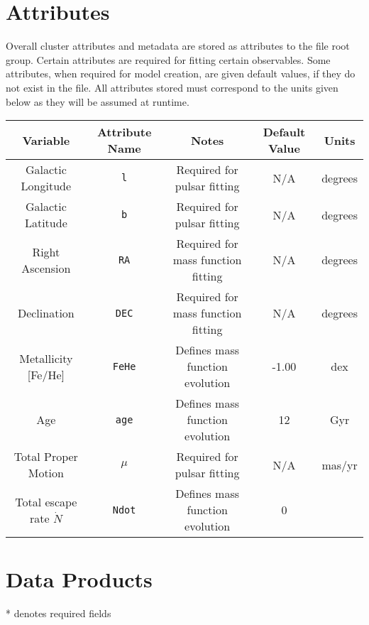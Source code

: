 \documentclass[12pt]{article}
\begin{document}
\section{Attributes}

Overall cluster attributes and metadata are stored as attributes to the
file root group. Certain attributes are required for fitting certain
observables. Some attributes, when required for model creation, are given
default values, if they do not exist in the file. All attributes stored must
correspond to the units given below as they will be assumed at runtime.

\begin{center}
\begin{table}[H]
\begin{tabular}{ | c | c | c | c | c | }
    \hline
    Variable & Attribute Name & Notes & Default Value & Units \\
    \hline\hline
    Galactic Longitude & \texttt{l} &
    Required for pulsar fitting & N/A & degrees \\
    \hline
    Galactic Latitude & \texttt{b}  &
    Required for pulsar fitting & N/A & degrees \\
    \hline
    Right Ascension & \texttt{RA} &
    Required for mass function fitting & N/A & degrees \\
    \hline
    Declination & \texttt{DEC}  &
    Required for mass function fitting & N/A & degrees \\
    \hline
    Metallicity [Fe/He] & \texttt{FeHe} &
    Defines mass function evolution & -1.00 & dex \\
    \hline
    Age & \texttt{age} & Defines mass function evolution & 12 & Gyr \\
    \hline
    Total Proper Motion & \texttt{\(\mu\)} &
    Required for pulsar fitting & N/A & mas/yr \\
    \hline
    Total escape rate \(\dot{N}\) & \texttt{Ndot} &
    Defines mass function evolution & 0 & \\
    \hline
\end{tabular}
\end{table}
\end{center}

\newpage



\newpage
\section{Data Products}

* denotes required fields










\end{document}
